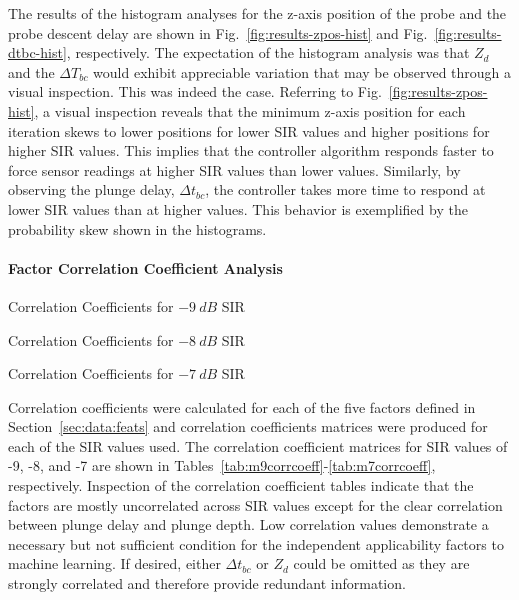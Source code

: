 The results of the histogram analyses for the z-axis position of the probe and the probe descent delay are shown in Fig.~\ref{fig:results-zpos-hist} and Fig.~\ref{fig:results-dtbc-hist}, respectively.  The expectation of the histogram analysis was that $Z_d$ and the $\Delta{T}_{bc}$ would exhibit appreciable variation that may be observed through a visual inspection.  This was indeed the case.  Referring to Fig.~\ref{fig:results-zpos-hist}, a visual inspection reveals that the minimum z-axis position for each iteration skews to lower positions for lower SIR values and higher positions for higher SIR values.  This implies that the controller algorithm responds faster to force sensor readings at higher SIR values than lower values.  Similarly, by observing the plunge delay, $\Delta{t}_{bc}$, the controller takes more time to respond at lower SIR values than at higher values.  This behavior is exemplified by the probability skew shown in the histograms. 

\paragraph{Factor Correlation Coefficient Analysis}

\begin{table}[!ht]

   	\centering
   	\caption{Correlation Coefficients for $-9\ dB$ SIR}
   	\label{ftml-conf:tab:m9corrcoeff}
   	
   	\vspace{5mm}

   	\centering
   	\caption{Correlation Coefficients for $-8\ dB$ SIR}
   	\label{ftml-conf:tab:m8corrcoeff}
   	
   	\vspace{5mm}

   	\centering
   	\caption{Correlation Coefficients for $-7\ dB$ SIR}
   	\label{ftml-conf:tab:m7corrcoeff}
   	

\end{table}

Correlation coefficients were calculated for each of the five factors defined in Section~\ref{sec:data:feats} and correlation coefficients matrices were produced for each of the SIR values used.  The correlation coefficient matrices for SIR values of -9, -8, and -7 are shown in Tables~\ref{tab:m9corrcoeff}-\ref{tab:m7corrcoeff}, respectively. Inspection of the correlation coefficient tables indicate that the factors are mostly uncorrelated across SIR values except for the clear correlation between plunge delay and plunge depth. Low correlation values demonstrate a necessary but not sufficient condition for the independent applicability factors to machine learning.  If desired, either $\Delta{t}_{bc}$ or $Z_d$ could be omitted as they are strongly correlated and therefore provide redundant information.

